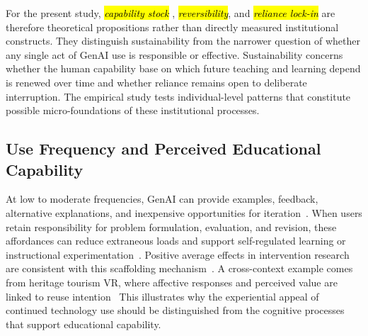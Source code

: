 \documentclass[sustainability,article,accept,moreauthors]{Definitions/mdpi}
\begin{document}
For the present study, \emph{\hl{capability stock}%
}, \emph{\hl{reversibility}}, and \emph{\hl{reliance lock-in}} are therefore theoretical propositions rather than directly measured institutional constructs. They distinguish sustainability from the narrower question of whether any single act of GenAI use is responsible or effective. Sustainability concerns whether the human capability base on which future teaching and learning depend is renewed over time and whether reliance remains open to deliberate interruption. The empirical study tests individual-level patterns that constitute possible micro-foundations of these institutional processes.


\subsection{Use Frequency and Perceived Educational Capability}

At low to moderate frequencies, GenAI can provide examples, feedback, alternative explanations, and inexpensive opportunities for iteration{~\cite{chiu2024}}. When users retain responsibility for problem formulation, evaluation, and revision, these affordances can reduce extraneous loads and support self-regulated learning or instructional experimentation{~\cite{wood1976,sweller2019}}. Positive average effects in intervention research are consistent with this scaffolding mechanism~\cite{sunzhou2024,gu2025}. {A cross-context example comes from heritage tourism VR, where affective responses and perceived value are linked to reuse intention~ %
 This illustrates why the experiential appeal of continued technology use should be distinguished from the cognitive processes that support educational capability.}
\end{document}
